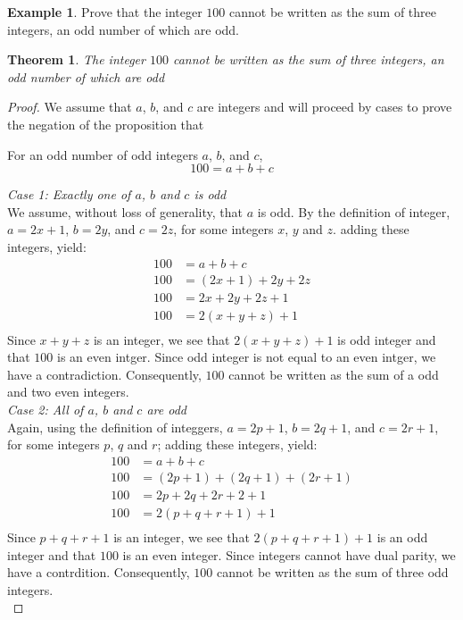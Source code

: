 \documentclass{book}
\newtheorem{theorem}{Theorem}[section]
\theoremstyle{definition}
\newtheorem{example}{Example}[definition]
\theoremstyle{remark}
\begin{document}
\newpage
\begin{example}
Prove that the integer $100$ cannot be written as the sum of three integers, an odd number of which are odd. 
\begin{tcolorbox}
    \begin{theorem}
        The integer $100$ cannot be written as the sum of three integers, an odd number of which are odd 
    \end{theorem}
\end{tcolorbox}

\begin{proof}
    We assume that $a$, $b$, and $c$ are integers and will proceed by cases to prove the negation of the proposition that  
        \begin{center}
            For an odd number of odd integers $a$, $b$, and $c$,
                \begin{equation*}
                    100 = a + b + c
                \end{equation*}
        \end{center}
    \textit{Case 1: Exactly one of $a$, $b$ and $c$ is odd} \\
        We assume, without loss of generality, that $a$ is odd. By the definition of integer, $a = 2x + 1$, $b = 2y$, and $c = 2z$, for some integers $x$, $y$ and $z$. adding these integers, yield:
            \begin{align*}
                100 & = a + b + c \\
                100 & = (2x + 1) + 2y + 2z \\
                100 & = 2x + 2y + 2z + 1 \\
                100 & = 2(x + y + z) + 1 \\
            \end{align*}
        Since $x + y + z$ is an integer, we see that $2(x + y + z) + 1$ is odd integer and that $100$ is an even intger. Since odd integer is not equal to an even intger, we have a contradiction. Consequently, $100$ cannot be written as the sum of a odd and two even integers. \\
    
    \textit{Case 2: All of $a$, $b$ and $c$ are odd} \\
        Again, using the definition of integgers, $a = 2p + 1$, $b = 2q + 1$, and $c = 2r + 1$, for some integers $p$, $q$ and $r$; adding these integers, yield:
            \begin{align*}
                100 & = a + b + c \\
                100 & = (2p + 1) + (2q + 1) + (2r + 1) \\
                100 & = 2p + 2q + 2r + 2 + 1 \\
                100 & = 2(p + q + r + 1) + 1 \\
            \end{align*}
        Since $p + q + r + 1$ is an integer, we see that $2(p + q + r + 1) + 1$ is an odd integer and that $100$ is an even integer. Since integers cannot have dual parity, we have a contrdition. Consequently, $100$ cannot be written as the sum of three odd integers. \\
        

\end{proof}
\end{example}
\end{document}
